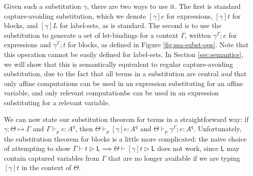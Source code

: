 \documentclass[acmsmall,screen,review]{acmart}
\newcommand{\ms}[1]{\ensuremath{\mathsf{#1}}}
\newcommand{\hasty}[5]{#1 \vdash_{#2} #3: {#4}^{#5}}
\newcommand{\haslb}[3]{#1 \vdash #2 \rhd #3}
\newcommand{\issubst}[3]{#1: #2 \mapsto #3}
\newcommand{\exprletsubst}[2]{{#1};{#2}}
\newcommand{\stmtletsubst}[2]{{#1};{#2}}
\newcommand{\substctx}[2]{{#1}^{#2}}
\begin{document}
Given such a substitution \(\gamma\), there are two ways to use it. The first is
standard capture-avoiding substitution, which we denote \([\gamma]e\) for
expressions, \([\gamma]t\) for blocks, and \([\gamma]L\) for label-sets, as is
standard. The second is to use the substitution to generate a set of
let-bindings for a context \(\Gamma\), written
\(\exprletsubst{\substctx{\gamma}{\Gamma}}{e}\) for expressions and
\(\stmtletsubst{\substctx{\gamma}{\Gamma}}{t}\) for blocks, as defined in Figure
\ref{fig:ssa-subst-ops}. Note that this operation cannot be easily defined for
label-sets. In Section \ref{sec:semantics}, we will show that this is
semantically equivalent to regular capture-avoiding substitution, due to the
fact that all terms in a substitution are central \textit{and} that only affine
computations can be used in an expression substituting for an affine variable,
and only relevant computationbs can be used in an expression substituting for a
relevant variable.

We can now state our substitution theorem for terms in a straightforward way: if
\(\issubst{\gamma}{\Theta}{\Gamma}\) and \(\hasty{\Gamma}{p}{e}{A}{q}\), then
\(\hasty{\Theta}{p}{[\gamma]e}{A}{q}\) and
\(\hasty{\Theta}{p}{\exprletsubst{\substctx{\gamma}{\Gamma}}{e}}{A}{q}\).
Unfortunately, the substitution theorem for blocks is a little more complicated:
the naive choice of attempting to show \(\haslb{\Gamma}{t}{\ms{L}} \implies
\haslb{\Theta}{[\gamma]t}{\ms{L}}\) does not work, since \(\ms{L}\) may contain
captured variables from \(\Gamma\) that are no longer available if we are typing
\([\gamma]t\) in the context of \(\Theta\). 
\end{document}
